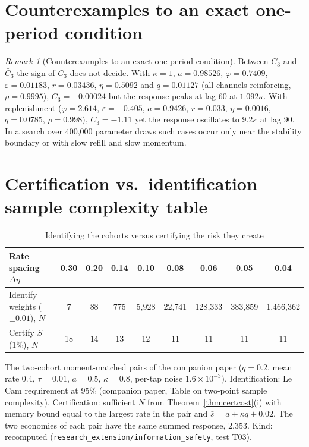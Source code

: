 \documentclass[12pt]{article}
\theoremstyle{definition}
\theoremstyle{remark}
\newtheorem{remark}[theorem]{Remark}
\begin{document}
\section{Counterexamples to an exact one-period condition}
\begin{remark}[Counterexamples to an exact one-period condition]\label{rem:counter}
Between $C_3$ and $\bar C_3$ the sign of $C_3$ does not decide. With $\kappa=1$, $a=0.98526$, $\varphi=0.7409$, $\varepsilon=0.01183$, $r=0.03436$, $\eta=0.5092$ and $q=0.01127$ (all channels reinforcing, $\rho=0.9995$), $C_3=-0.00024$ but the response peaks at lag 60 at $1.092\kappa$. With replenishment ($\varphi=2.614$, $\varepsilon=-0.405$, $a=0.9426$, $r=0.033$, $\eta=0.0016$, $q=0.0785$, $\rho=0.998$), $C_3=-1.11$ yet the response oscillates to $9.2\kappa$ at lag 90. In a search over 400{,}000 parameter draws such cases occur only near the stability boundary or with slow refill and slow momentum.
\end{remark}
\section{Certification vs.\ identification sample complexity table}
\FloatBarrier
\begin{table}[t]\centering\small
\begin{threeparttable}
\caption{Identifying the cohorts versus certifying the risk they create}\label{tab:certvsid}
\begin{tabular}{lcccccccc}
\toprule
Rate spacing $\Delta\eta$ & 0.30 & 0.20 & 0.14 & 0.10 & 0.08 & 0.06 & 0.05 & 0.04\\
\midrule
Identify weights ($\pm0.01$), $N$ & 7 & 88 & 775 & 5{,}928 & 22{,}741 & 128{,}333 & 383{,}859 & 1{,}466{,}362\\
Certify $S$ (1\%), $N$ & 18 & 14 & 13 & 12 & 11 & 11 & 11 & 11\\
\bottomrule
\end{tabular}
\begin{tablenotes}\footnotesize\item The two-cohort moment-matched pairs of the companion paper ($q=0.2$, mean rate $0.4$, $\tau=0.01$, $a=0.5$, $\kappa=0.8$, per-tap noise $1.6\times10^{-3}$). Identification: Le Cam requirement at 95\% (companion paper, Table on two-point sample complexity). Certification: sufficient $N$ from Theorem~\ref{thm:certcost}(i) with memory bound equal to the largest rate in the pair and $\bar s=a+\kappa q+0.02$. The two economies of each pair have the same summed response, $2.353$. Kind: recomputed (\texttt{research\_extension/information\_safety}, test T03).\end{tablenotes}
\end{threeparttable}
\end{table}
\FloatBarrier
\end{document}
